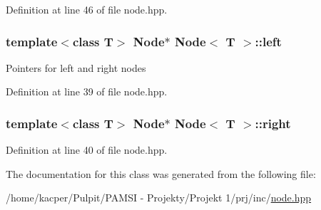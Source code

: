 Definition at line 46 of file node.\+hpp.

\subsubsection[{\texorpdfstring{left}{left}}]{\setlength{\rightskip}{0pt plus 5cm}template$<$class T$>$ {\bf Node}$\ast$ {\bf Node}$<$ T $>$\+::left}\hypertarget{class_node_a6596c7ac17ecafff5522310c0da3a828}{}\label{class_node_a6596c7ac17ecafff5522310c0da3a828}
Pointers for left and right nodes 

Definition at line 39 of file node.\+hpp.

\subsubsection[{\texorpdfstring{right}{right}}]{\setlength{\rightskip}{0pt plus 5cm}template$<$class T$>$ {\bf Node}$\ast$ {\bf Node}$<$ T $>$\+::right}\hypertarget{class_node_a4009a1138f2f04372037fbec63406f11}{}\label{class_node_a4009a1138f2f04372037fbec63406f11}


Definition at line 40 of file node.\+hpp.



The documentation for this class was generated from the following file\+:\begin{DoxyCompactItemize}
\item 
/home/kacper/\+Pulpit/\+P\+A\+M\+S\+I -\/ Projekty/\+Projekt 1/prj/inc/\hyperlink{node_8hpp}{node.\+hpp}\end{DoxyCompactItemize}
